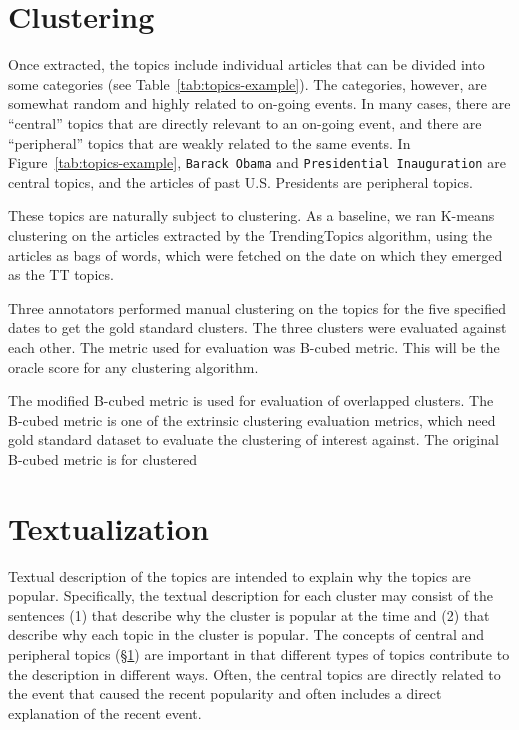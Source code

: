 \documentclass[11pt]{article}
\begin{document}
\section{Clustering}
\label{ssec:clustering}

Once extracted, the topics include individual articles that can be divided into some categories (see Table~\ref{tab:topics-example}). The categories, however, are somewhat random and highly related to on-going events. In many cases, there are ``central'' topics that are directly relevant to an on-going event, and there are ``peripheral'' topics that are weakly related to the same events. In Figure~\ref{tab:topics-example}, \verb'Barack Obama' and \verb'Presidential Inauguration' are central topics, and the articles of past U.S. Presidents are peripheral topics.

These topics are naturally subject to clustering. As a baseline, we ran K-means clustering on the articles extracted by the TrendingTopics algorithm, using the articles as bags of words, which were fetched on the date on which they emerged as the TT topics.

Three annotators performed manual clustering on the topics for the five specified dates to get the gold standard clusters. The three clusters were evaluated against each other. The metric used for evaluation was B-cubed metric. This will be the oracle score for any clustering algorithm.

The modified B-cubed metric \cite{Amigo:09} is used for evaluation of overlapped clusters. The B-cubed metric is one of the extrinsic clustering evaluation metrics, which need gold standard dataset to evaluate the clustering of interest against. The original B-cubed metric is for clustered 

\section{Textualization}

Textual description of the topics are intended to explain why the topics are popular. Specifically, the textual description for each cluster may consist of the sentences (1) that describe why the cluster is popular at the time and (2) that describe why each topic in the cluster is popular. The concepts of central and peripheral topics (\S\ref{ssec:clustering}) are important in that different types of topics contribute to the description in different ways. Often, the central topics are directly related to the event that caused the recent popularity and often includes a direct explanation of the recent event. 
\end{document}
